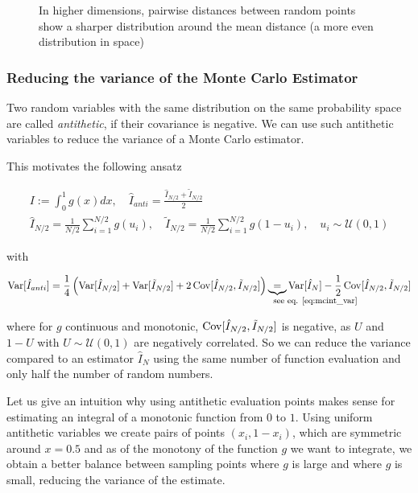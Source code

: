 \begin{figure}[!htb]
 \centering
 \hfill
 \caption{In higher dimensions, pairwise distances between random points show a sharper distribution around the mean distance
 (a more even distribution in space)}
 \label{fig:curse}
\end{figure}

\subsubsection{Reducing the variance of the Monte Carlo Estimator}


Two random variables with the same distribution on the same probability space are called \textit{antithetic}, if their covariance is negative.
We can use such antithetic variables to reduce the variance of a Monte Carlo estimator.

This motivates the following ansatz

\begin{equation}
    \begin{multlined}
        I := \int_{0}^{1} g(x) dx, \quad \hat{I}_{anti} = \frac{\hat{I}_{N / 2} + \tilde{I}_{N / 2}}{2} \\
        \hat{I}_{N / 2} = \frac{1}{N / 2} \sum_{i=1}^{N / 2} g(u_i), \quad \tilde{I}_{N / 2} = \frac{1}{N / 2} \sum_{i=1}^{N / 2} g(1 - u_i), \quad u_i \sim \mathcal{U}(0, 1)
    \end{multlined}
\end{equation}

with

\begin{equation}
    \Var[\hat{I}_{anti}] = \frac{1}{4} \left(\Var[\hat{I}_{N / 2}] + \Var[\tilde{I}_{N / 2}] + 2 \Cov[\hat{I}_{N / 2}, \tilde{I}_{N / 2}]\right) \explain{=}{\text{see eq. \ref{eq:mcint_var}}} \Var[\hat{I}_N] - \frac{1}{2} \Cov[\hat{I}_{N / 2}, \tilde{I}_{N / 2}]
\end{equation}

where for $g$ continuous and monotonic, $\operatorname{Cov}[\hat{I}_{N / 2}, \tilde{I}_{N / 2}]$ is negative, as $U$ and $1 - U$ with $U \sim \mathcal{U}(0, 1)$ are negatively correlated. So we can reduce the variance compared to an estimator $\hat{I}_N$ using the same number of function 
evaluation and only half the number of random numbers.

Let us give an intuition why using antithetic evaluation points makes sense for estimating an integral of a monotonic function from $0$ to $1$. Using uniform antithetic variables we create pairs of points $(x_i, 1 - x_i)$, which are symmetric around $x = 0.5$ and as of the monotony of the function $g$ we want to integrate, we obtain a better balance between sampling points where $g$ is large and where $g$ is small, reducing the variance of the estimate.

